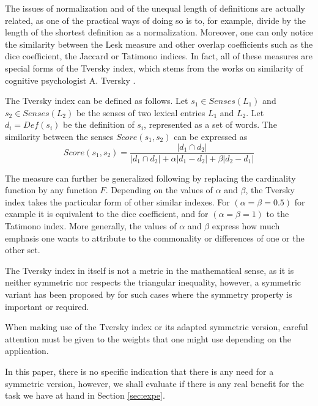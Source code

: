 \documentclass[10pt, a4paper]{article}
\begin{document}
 The issues of normalization and of the unequal length of definitions are actually related, as one of the practical ways of doing so is to, for example, divide by the length of the shortest definition as a normalization. Moreover, one can only notice the similarity between the Lesk measure and other overlap coefficients such as the dice coefficient, the Jaccard or Tatimono indices. In fact, all of these measures are special forms of the Tversky index, which stems from the works on similarity of cognitive psychologist A. Tversky \cite{tversky77similarity}.

The Tversky index can be defined as follows. Let \(s_1 \in Senses(L_1)\)  and \(s_2 \in Senses(L_2)\) be the senses of two lexical entries \(L_1\) and \(L_2\). Let \(d_i=Def(s_i)\) be the definition of \(s_i\), represented as a set of words. The similarity between the senses \(Score(s_1, s_2)\) can be expressed as 
\[
Score(s_1,s_2) = 
\frac{|d_1\cap d_2|}{|d_1\cap d_2| + \alpha |d_1-d_2| + \beta |d_2-d_1|}
\]

The measure can further be generalized following \cite{DBLP:conf/otm/PirroE10} by replacing the cardinality function by any function \(F\). Depending on the values of \(\alpha\) and \(\beta\), the Tversky index takes the particular form of other similar indexes. For \((\alpha=\beta=0.5)\) for example it is equivalent to the dice coefficient, and for  \((\alpha=\beta=1)\) to the Tatimono index. More generally, the values of \(\alpha\) and \(\beta\) express how much emphasis one wants to attribute to the commonality or differences of one or the other set.

 The Tversky index in itself is not a metric in the mathematical sense, as it is neither symmetric nor respects the triangular inequality, however, a symmetric variant has been proposed by \cite{Jimenez2010} for such cases where the symmetry property is important or required.
% 
 
 When making use of the Tversky index or its adapted symmetric version, careful attention must be given to the weights that one might use depending on the application. 
 
 In this paper, there is no specific indication that there is any need for a symmetric version, however, we shall evaluate if there is any real benefit for the task we have at hand in Section \ref{sec:expe}. 
\end{document}
